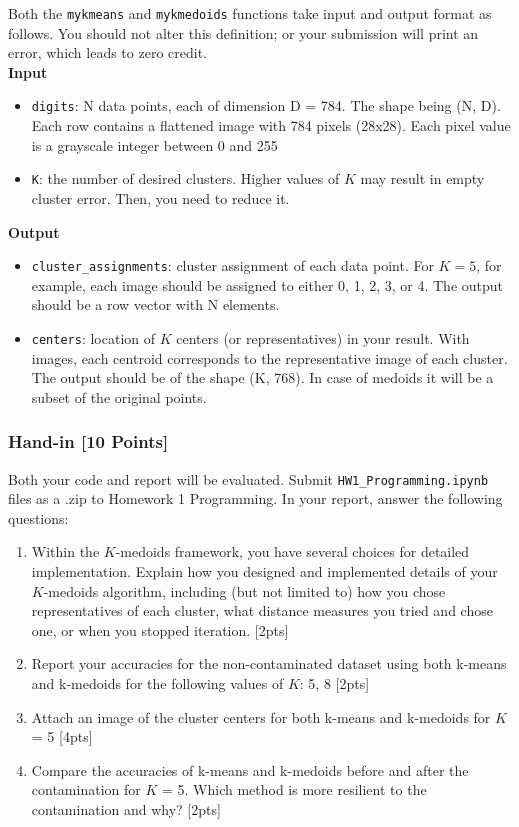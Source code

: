 \documentclass[11pt,epic]{article}
\begin{document}
Both the \texttt{mykmeans} and \texttt{mykmedoids} functions take input and output format as follows. You should not alter this definition; or your submission will print an error, which leads to zero credit.\\

\textbf{Input}
\begin{itemize}
  \item \texttt{digits}: N data points, each of dimension D = 784. The shape being (N, D). Each row contains a flattened image with 784 pixels (28x28). Each pixel value is a grayscale integer between 0 and 255
  \item \texttt{K}: the number of desired clusters. Higher values of $K$ may result in empty cluster error. Then, you need to reduce it.
\end{itemize}

\textbf{Output}
\begin{itemize}
  \item \texttt{cluster\_assignments}: cluster assignment of each data point. For $K = 5$, for example, each image should be assigned to either 0, 1, 2, 3, or 4. The output should be a row vector with N elements.
  \item \texttt{centers}: location of $K$ centers (or representatives) in your result. With images, each centroid corresponds to the representative image of each cluster. The output should be of the shape (K, 768). In case of medoids it will be a subset of the original points.
\end{itemize}

\subsubsection*{Hand-in [10 Points]}
Both your code and report will be evaluated. Submit \texttt{HW1\_Programming.ipynb} files as a .zip to Homework 1 Programming. In your report, answer the following questions:
\begin{enumerate}
    \item Within the $K$-medoids framework, you have several choices for detailed implementation. Explain how you designed and implemented details of your $K$-medoids algorithm, including (but not limited to) how you chose representatives of each cluster, what distance measures you tried and chose one, or when you stopped iteration. [2pts]
    \item Report your accuracies for the non-contaminated dataset using both k-means and k-medoids for the following values of $K$: 5, 8 [2pts]
    \item Attach an image of the cluster centers for both k-means and k-medoids for $K$ = 5 [4pts]
    \item Compare the accuracies of k-means and k-medoids before and after the contamination for $K$ = 5. Which method is more resilient to the contamination and why? [2pts]
\end{enumerate}
\end{document}
